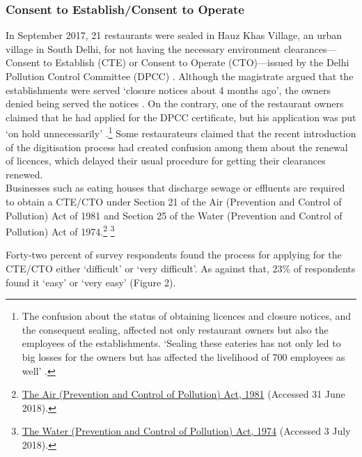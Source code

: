 \documentclass[a4paper, 12pt, twoside]{article}
\begin{document}
                   \subsubsection{Consent to Establish/Consent to Operate}
                   In September 2017, 21 restaurants were sealed in Hauz Khas Village, an urban village in South Delhi, for not having the necessary environment clearances—Consent to Establish (CTE) or Consent to Operate (CTO)—issued by the Delhi Pollution 
Control Committee (DPCC) \parencite{ht2017delhkvsealing}. Although the magistrate argued that the establishments were served ‘closure notices about 4 months ago’, the owners denied being served the notices \parencite{ht2017delhkvsealing}. On the contrary, one of the restaurant owners claimed that he had applied for the DPCC certificate, but his application was put ‘on hold unnecessarily’ \parencite{ht2017delhkvsealing}.\footnote{The confusion about the status of obtaining licences and closure notices, and the consequent sealing, affected not only restaurant owners but also the employees of the establishments. ‘Sealing these eateries has not only led to big losses for the owners but has affected the livelihood of 700 employees as well’ \parencite{dnahkvsealingdrive}.} Some restaurateurs claimed that the recent introduction of the digitisation process had created confusion among them about the renewal of licences, which delayed their usual procedure for getting their clearances renewed.\\ %
                   
                   Businesses such as eating houses that discharge sewage or effluents are required to obtain a CTE/CTO under Section 21 of the Air (Prevention and Control of Pollution) Act of 1981 and Section 25 of the Water (Prevention and Control of Pollution) Act 
of 1974.\footnote{\href{https://bit.ly/2pbaWOw}{The Air (Prevention and Control of Pollution) Act, 1981} (Accessed 31 June 2018).} \footnote{\href{https://bit.ly/2xcUyRW}{The Water (Prevention and Control of Pollution) Act, 1974} (Accessed 3 July 2018).}  %
                   
                   Forty-two percent of survey respondents found the process for applying for the CTE/CTO either ‘difficult’ or ‘very difficult’. As against that, 23\% of respondents found it ‘easy’ or ‘very easy’ (Figure 2).

\end{document}
